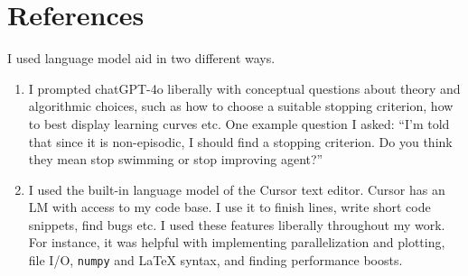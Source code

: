\documentclass{article}
\begin{document}
\clearpage
\section*{References}
I used language model aid in two different ways.
\begin{enumerate}
    \item I prompted chatGPT-4o liberally with conceptual questions about theory and algorithmic choices, such as how to choose a suitable stopping criterion, how to best display learning curves etc. One example question I asked: ``I'm told that since it is non-episodic, I should find a stopping criterion. Do you think they mean stop swimming or stop improving agent?''
    \item I used the built-in language model of the Cursor text editor. Cursor has an LM with access to my code base. I use it to finish lines, write short code snippets, find bugs etc. I used these features liberally throughout my work. For instance, it was helpful with implementing parallelization and plotting, file I/O, \lstinline|numpy| and LaTeX syntax, and finding performance boosts.
\end{enumerate}
\end{document}
